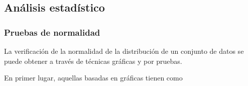 \subsection{Análisis estadístico}

\subsubsection{Pruebas de normalidad}

La verificación de la normalidad de la distribución de un conjunto de datos se 
puede obtener a través de técnicas gráficas y por pruebas. 

En primer lugar, aquellas basadas en gráficas tienen como 
